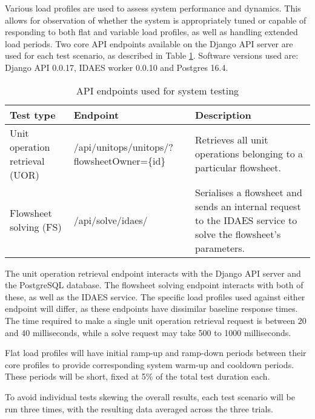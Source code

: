 Various load profiles are used to assess system performance and dynamics. This allows for observation of whether the system is appropriately tuned or capable of responding to both flat and variable load profiles, as well as handling extended load periods. Two core API endpoints available on the Django API server are used for each test scenario, as described in Table \ref{table:test-api-endpoints}. Software versions used are: Django API 0.0.17, IDAES worker 0.0.10 and Postgres 16.4.

\begin{table}[h]
    \centering
    \begin{tabularx}{\textwidth}{|p{}|X|p{}|}
        \hline
        \textbf{Test type} & \textbf{Endpoint} & \textbf{Description} \\ \hline
        Unit operation retrieval (UOR) & /api/unitops/unitops/?flowsheetOwner=\{id\} & Retrieves all unit operations belonging to a particular flowsheet. \\ \hline

        Flowsheet solving (FS) & /api/solve/idaes/ & Serialises a flowsheet and sends an internal request to the IDAES service to solve the flowsheet's parameters. \\ \hline
    \end{tabularx}
    \caption{API endpoints used for system testing}
    \label{table:test-api-endpoints}
\end{table}

The unit operation retrieval endpoint interacts with the Django API server and the PostgreSQL database. The flowsheet solving endpoint interacts with both of these, as well as the IDAES service. The specific load profiles used against either endpoint will differ, as these endpoints have dissimilar baseline response times. The time required to make a single unit operation retrieval request is between 20 and 40 milliseconds, while a solve request may take 500 to 1000 milliseconds.


Flat load profiles will have initial ramp-up and ramp-down periods between their core profiles to provide corresponding system warm-up and cooldown periods. These periods will be short, fixed at 5\% of the total test duration each.

To avoid individual tests skewing the overall results, each test scenario will be run three times, with the resulting data averaged across the three trials.

